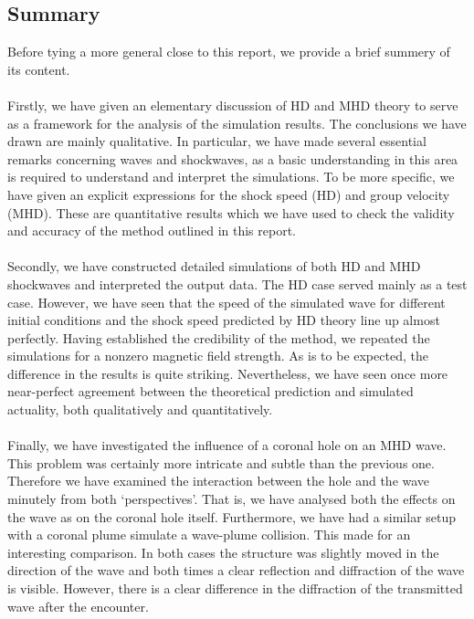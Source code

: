 \subsection*{Summary}

Before tying a more general close to this report, we provide a brief summery of its content.\\
\\
Firstly, we have given an elementary discussion of HD and MHD theory to serve as a framework for the analysis of the simulation results. The conclusions we have drawn are mainly qualitative. In particular, we have made several essential remarks concerning waves and shockwaves, as a basic understanding in this area is required to understand and interpret the simulations. To be more specific, we have given an explicit expressions for the shock speed (HD) and group velocity (MHD). These are quantitative results which we have used to check the validity and accuracy of the method outlined in this report. \\
\\
Secondly, we have constructed detailed simulations of both HD and MHD shockwaves and interpreted the output data. The HD case served mainly as a test case. However, we have seen that the speed of the simulated wave for different initial conditions and the shock speed predicted by HD theory line up almost perfectly. Having established the credibility of the method, we repeated the simulations for a nonzero magnetic field strength. As is to be expected, the difference in the results is quite striking. Nevertheless, we have seen once more near-perfect agreement between the theoretical prediction and simulated actuality, both qualitatively and quantitatively.\\
\\
Finally, we have investigated the influence of a coronal hole on an MHD wave. This problem was certainly more intricate and subtle than the previous one. Therefore we have examined the interaction between the hole and the wave minutely from both `perspectives'. That is, we have analysed both the effects on the wave as on the coronal hole itself. Furthermore, we have had a similar setup with a coronal plume simulate a wave-plume collision. This made for an interesting comparison. In both cases the structure was slightly moved in the direction of the wave and both times a clear reflection and diffraction of the wave is visible. However, there is a clear difference in the diffraction of the transmitted wave after the encounter. 

